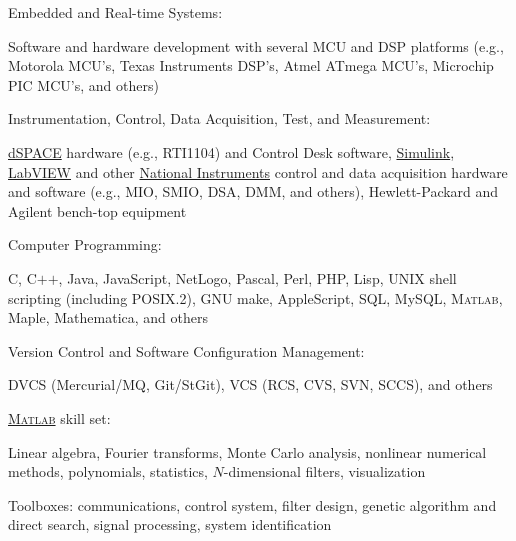 \documentclass[10pt]{article}
\newcommand{\halfblankline}{\quad\vspace{-0.5\baselineskip}\pagebreak[3]}
\providecommand\Matlab{\textsc{Matlab}}
\begin{document}
\halfblankline

Embedded and Real-time Systems:
%
\begin{innerlist}
    \item Software and hardware development with several MCU and
        DSP platforms (e.g., Motorola MCU's, Texas Instruments DSP's, Atmel
        ATmega MCU's, Microchip PIC MCU's, and others)
\end{innerlist}

\halfblankline

Instrumentation, Control, Data Acquisition, Test, and Measurement:
%
\begin{innerlist}
    \item \href{http://www.dspaceinc.com/}{dSPACE} hardware (e.g.,
        RTI1104) and Control Desk software,
        \href{http://www.mathworks.com/products/simulink/}{Simulink},
        \href{http://www.ni.com/}{LabVIEW} and other
        \href{http://www.ni.com}{National Instruments}
        control and data acquisition hardware and software (e.g., MIO,
        SMIO, DSA, DMM, and others), Hewlett-Packard and Agilent
        bench-top equipment
\end{innerlist}

\halfblankline

Computer Programming:
%
\begin{innerlist}
    \item C, C$+$$+$, Java, JavaScript, NetLogo, Pascal, Perl, PHP,
        Lisp, UNIX shell scripting (including POSIX.2), GNU make,
        AppleScript, SQL, MySQL, \Matlab, Maple, Mathematica, and others
\end{innerlist}

\halfblankline

Version Control and Software Configuration Management:
%
\begin{innerlist}
    \item DVCS (Mercurial/MQ, Git/StGit), VCS (RCS, CVS, SVN, SCCS), and
        others
\end{innerlist}

\halfblankline

\href{http://www.mathworks.com/products/matlab/}{\Matlab} skill set:
%
\begin{innerlist}
    \item Linear algebra, Fourier transforms, Monte Carlo analysis,
        nonlinear numerical methods, polynomials, statistics,
        $N$-dimensional filters, visualization

    \item Toolboxes: communications, control system, filter design,
        genetic algorithm and direct search, signal processing, system
        identification
\end{innerlist}
\end{document}
